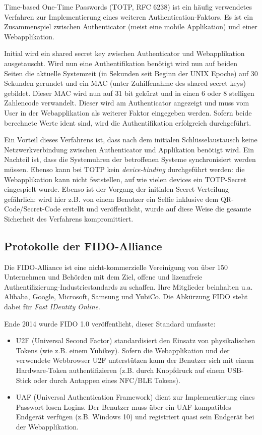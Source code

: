 Time-based One-Time Passwords (TOTP, RFC 6238) ist ein häufig verwendetes Verfahren zur Implementierung eines weiteren Authentication-Faktors. Es ist ein Zusammenspiel zwischen Authenticator (meist eine mobile Applikation) und einer Webapplikation.

Initial wird ein shared secret key zwischen Authenticator und Webapplikation ausgetauscht. Wird nun eine Authentifikation benötigt wird nun auf beiden Seiten die aktuelle Systemzeit (in Sekunden seit Beginn der UNIX Epoche) auf 30 Sekunden gerundet und ein MAC (unter Zuhilfenahme des shared secret keys) gebildet. Dieser MAC wird nun auf 31 bit gekürzt und in einen 6 oder 8 stelligen Zahlencode verwandelt. Dieser wird am Authenticator angezeigt und muss vom User in der Webapplikation als weiterer Faktor eingegeben werden. Sofern beide berechnete Werte ident sind, wird die Authentifikation erfolgreich durchgeführt.

Ein Vorteil dieses Verfahrens ist, dass nach dem initialen Schlüsselaustausch keine Netzwerkverbindung zwischen Authenticator und Applikation benötigt wird. Ein Nachteil ist, dass die Systemuhren der betroffenen Systeme synchronisiert werden müssen. Ebenso kann bei TOTP kein \textit{device-binding} durchgeführt werden: die Webapplikation kann nicht feststellen, auf wie vielen devices ein TOTP-Secret eingespielt wurde. Ebenso ist der Vorgang der initialen Secret-Verteilung gefährlich: wird hier z.B. von einem Benutzer ein Selfie inklusive dem QR-Code/Secret-Code erstellt und veröffentlicht, wurde auf diese Weise die gesamte Sicherheit des Verfahrens kompromittiert.

\subsection{Protokolle der FIDO-Alliance}

Die FIDO-Alliance ist eine nicht-kommerzielle Vereinigung von über 150 Unternehmen und Behörden mit dem Ziel, offene und lizenzfreie Authentifizierung-Industriestandards zu schaffen. Ihre Mitglieder beinhalten u.a. Alibaba, Google, Microsoft, Samsung und YubiCo. Die Abkürzung FIDO steht dabei für \textit{Fast IDentity Online}.

Ende 2014 wurde FIDO 1.0 veröffentlicht, dieser Standard umfasste:

\begin{itemize}
	\item U2F (Universal Second Factor) standardisiert den Einsatz von physikalischen Tokens (wie z.B. einem Yubikey). Sofern die Webapplikation und der verwendete Webbrowser U2F unterstützen kann der Benutzer sich mit einem Hardware-Token authentifizieren (z.B. durch Knopfdruck auf einem USB-Stick oder durch Antappen eines NFC/BLE Tokens).
	\item UAF (Universal Authentication Framework) dient zur Implementierung eines Passwort-losen Logins. Der Benutzer muss über ein UAF-kompatibles Endgerät verfügen (z.B. Windows 10) und registriert quasi sein Endgerät bei der Webapplikation.
\end{itemize}

